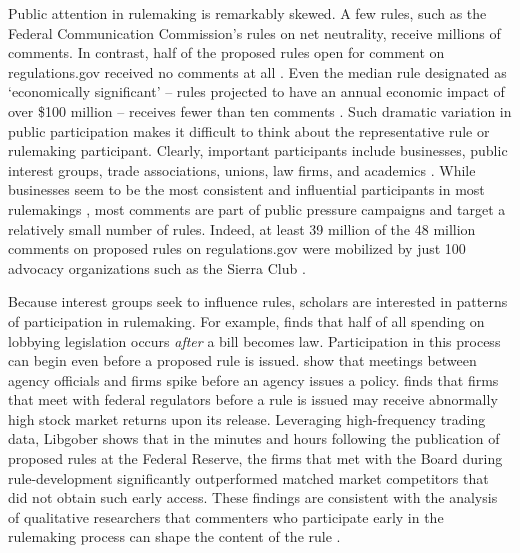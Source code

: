 \documentclass[
      12pt,
        ]{article}
\begin{document}
Public attention in rulemaking is remarkably skewed. A few rules, such
as the Federal Communication Commission's rules on net neutrality,
receive millions of comments. In contrast, half of the proposed rules
open for comment on regulations.gov received no comments at all
\citep{LibgoberJOP}. Even the median rule designated as `economically
significant' -- rules projected to have an annual economic impact of
over \$100 million -- receives fewer than ten comments
\citep{judgelord2019SPSA}. Such dramatic variation in public
participation makes it difficult to think about the representative rule
or rulemaking participant. Clearly, important participants include
businesses, public interest groups, trade associations, unions, law
firms, and academics \citep{CuellarALR2005, YackeeJOP2006}. While
businesses seem to be the most consistent and influential participants
in most rulemakings \citep{YackeeJOP2006, LibgoberJOP}, most comments
are part of public pressure campaigns and target a relatively small
number of rules. Indeed, at least 39 million of the 48 million comments
on proposed rules on regulations.gov were mobilized by just 100 advocacy
organizations such as the Sierra Club \citep{judgelord2019SPSA}.

Because interest groups seek to influence rules, scholars are interested
in patterns of participation in rulemaking. For example,
\citet{YouJOP2017} finds that half of all spending on lobbying
legislation occurs \emph{after} a bill becomes law. Participation in
this process can begin even before a proposed rule is issued.
\citet{deFigureidoKimICC2004} show that meetings between agency
officials and firms spike before an agency issues a policy.
\citet{LibgoberQJPS} finds that firms that meet with federal regulators
before a rule is issued may receive abnormally high stock market returns
upon its release. Leveraging high-frequency trading data, Libgober shows
that in the minutes and hours following the publication of proposed
rules at the Federal Reserve, the firms that met with the Board during
rule-development significantly outperformed matched market competitors
that did not obtain such early access. These findings are consistent
with the analysis of qualitative researchers that commenters who
participate early in the rulemaking process can shape the content of the
rule \citep{NaughtonJPAM2009}.
\end{document}
